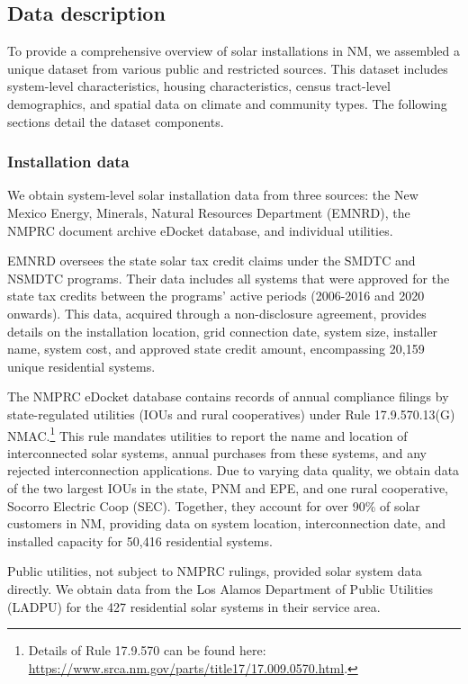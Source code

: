 \documentclass[12pt,twoside,letterpaper]{article}
\begin{document}
\subsection{Data description}
\label{section:data_collect}

To provide a comprehensive overview of solar installations in NM, we assembled a unique dataset from various public and restricted sources. This dataset includes system-level characteristics, housing characteristics, census tract-level demographics, and spatial data on climate and community types. The following sections detail the dataset components.

\subsubsection{Installation data}

We obtain system-level solar installation data from three sources: the New Mexico Energy, Minerals, Natural Resources Department (EMNRD), the NMPRC document archive eDocket database, and individual utilities. 

EMNRD oversees the state solar tax credit claims under the SMDTC and NSMDTC programs. Their data includes all systems that were approved for the state tax credits between the programs' active periods (2006-2016 and 2020 onwards). This data, acquired through a non-disclosure agreement, provides details on the installation location, grid connection date, system size, installer name, system cost, and approved state credit amount, encompassing 20,159 unique residential systems.

The NMPRC eDocket database contains records of annual compliance filings by state-regulated utilities (IOUs and rural cooperatives) under Rule 17.9.570.13(G) NMAC.\footnote{Details of Rule 17.9.570 can be found here: \url{https://www.srca.nm.gov/parts/title17/17.009.0570.html}.} This rule mandates utilities to report the name and location of interconnected solar systems, annual purchases from these systems, and any rejected interconnection applications. Due to varying data quality, we obtain data of the two largest IOUs in the state, PNM and EPE, and one rural cooperative, Socorro Electric Coop (SEC). Together, they account for over 90\% of solar customers in NM, providing data on system location, interconnection date, and installed capacity for 50,416 residential systems.

Public utilities, not subject to NMPRC rulings, provided solar system data directly. We obtain data from the Los Alamos Department of Public Utilities (LADPU) for the 427 residential solar systems in their service area.
\end{document}
